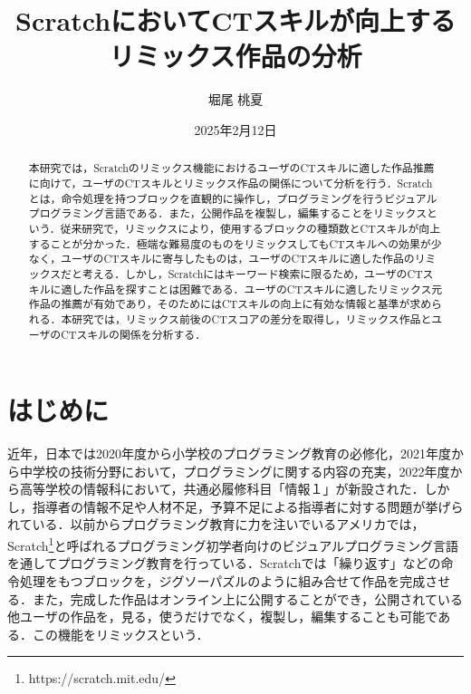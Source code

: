\documentclass[11pt]{jreport}
\title{ScratchにおいてCTスキルが向上する\\リミックス作品の分析}
\author{堀尾 桃夏}
\date{2025年2月12日}
\begin{document}
\maketitle

\begin{abstract}

本研究では，Scratchのリミックス機能におけるユーザのCTスキルに適した作品推薦に向けて，ユーザのCTスキルとリミックス作品の関係について分析を行う．Scratchとは，命令処理を持つブロックを直観的に操作し，プログラミングを行うビジュアルプログラミング言語である．また，公開作品を複製し，編集することをリミックスという．従来研究で，リミックスにより，使用するブロックの種類数とCTスキルが向上することが分かった．極端な難易度のものをリミックスしてもCTスキルへの効果が少なく，ユーザのCTスキルに寄与したものは，ユーザのCTスキルに適した作品のリミックスだと考える．しかし，Scratchにはキーワード検索に限るため，ユーザのCTスキルに適した作品を探すことは困難である．ユーザのCTスキルに適したリミックス元作品の推薦が有効であり，そのためにはCTスキルの向上に有効な情報と基準が求められる．本研究では，リミックス前後のCTスコアの差分を取得し，リミックス作品とユーザのCTスキルの関係を分析する． 



\end{abstract}

\tableofcontents



\newpage
{}	%



\chapter{はじめに}

近年，日本では2020年度から小学校のプログラミング教育の必修化，2021年度から中学校の技術分野において，プログラミングに関する内容の充実，2022年度から高等学校の情報科において，共通必履修科目「情報１」が新設された\cite{monkashou}．しかし，指導者の情報不足や人材不足，予算不足による指導者に対する問題が挙げられている\cite{monkashou2}．以前からプログラミング教育に力を注いでいるアメリカでは，Scratch\footnote{https://scratch.mit.edu/}\cite{resnick2009scratch}と呼ばれるプログラミング初学者向けのビジュアルプログラミング言語を通してプログラミング教育を行っている．Scratchでは「繰り返す」などの命令処理をもつブロックを，ジグソーパズルのように組み合せて作品を完成させる．また，完成した作品はオンライン上に公開することができ，公開されている他ユーザの作品を，見る，使うだけでなく，複製し，編集することも可能である．この機能をリミックスという．
\end{document}
